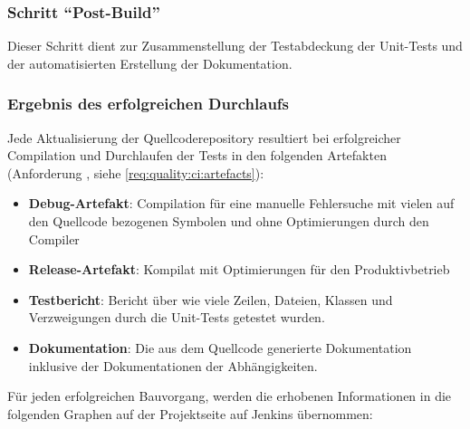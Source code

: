 \subsubsection{Schritt \enquote{Post-Build}}
Dieser Schritt dient zur Zusammenstellung der Testabdeckung der Unit-Tests und der automatisierten  Erstellung der Dokumentation.

\subsubsection{Ergebnis des erfolgreichen Durchlaufs}
Jede Aktualisierung der Quellcoderepository resultiert bei erfolgreicher Compilation und Durchlaufen der Tests in den folgenden Artefakten (Anforderung , siehe \autoref{req:quality:ci:artefacts}):
\begin{itemize}
	\item \textbf{Debug-Artefakt}: Compilation für eine manuelle Fehlersuche mit vielen auf den Quellcode bezogenen Symbolen und ohne Optimierungen durch den Compiler
	\item \textbf{Release-Artefakt}: Kompilat mit Optimierungen für den Produktivbetrieb
	\item \textbf{Testbericht}: Bericht über wie viele Zeilen, Dateien, Klassen und Verzweigungen durch die Unit-Tests getestet wurden.
	\item \textbf{Dokumentation}: Die aus dem Quellcode generierte Dokumentation inklusive der Dokumentationen der Abhängigkeiten.
\end{itemize}

Für jeden erfolgreichen Bauvorgang, werden die erhobenen Informationen in die folgenden Graphen auf der Projektseite auf Jenkins übernommen:

